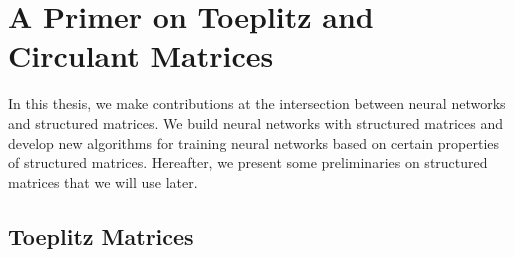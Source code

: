 



\section{A Primer on Toeplitz and Circulant Matrices}
\label{section:ch2-a_primer_on_toeplitz_and_circulant_matrices}

In this thesis, we make contributions at the intersection between neural networks and structured matrices.
We build neural networks with structured matrices and develop new algorithms for training neural networks based on certain properties of structured matrices. 
Hereafter, we present some preliminaries on structured matrices that we will use later. 

\subsection{Toeplitz Matrices}
\label{subsection:ch2-toeplitz_matrices}

